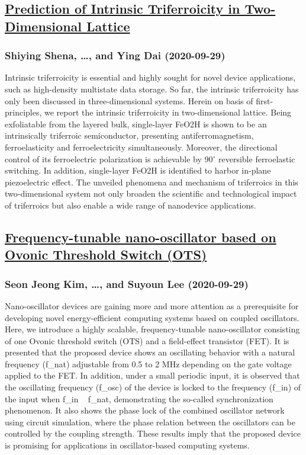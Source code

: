 \subsection*{\href{http://arxiv.org/abs/2009.13705v1}{Prediction of Intrinsic Triferroicity in Two-Dimensional Lattice}}
\subsubsection*{Shiying Shena, \dots, and Ying Dai (2020-09-29)}
Intrinsic triferroicity is essential and highly sought for novel device
applications, such as high-density multistate data storage. So far, the
intrinsic triferroicity has only been discussed in three-dimensional systems.
Herein on basis of first-principles, we report the intrinsic triferroicity in
two-dimensional lattice. Being exfoliatable from the layered bulk, single-layer
FeO2H is shown to be an intrinsically triferroic semiconductor, presenting
antiferromagnetism, ferroelasticity and ferroelectricity simultaneously.
Moreover, the directional control of its ferroelectric polarization is
achievable by 90$^{\circ}$ reversible ferroelastic switching. In addition,
single-layer FeO2H is identified to harbor in-plane piezoelectric effect. The
unveiled phenomena and mechanism of triferroics in this two-dimensional system
not only broaden the scientific and technological impact of triferroics but
also enable a wide range of nanodevice applications.

\subsection*{\href{http://arxiv.org/abs/2009.13703v1}{Frequency-tunable nano-oscillator based on Ovonic Threshold Switch (OTS)}}
\subsubsection*{Seon Jeong Kim, \dots, and Suyoun Lee (2020-09-29)}
Nano-oscillator devices are gaining more and more attention as a prerequisite
for developing novel energy-efficient computing systems based on coupled
oscillators. Here, we introduce a highly scalable, frequency-tunable
nano-oscillator consisting of one Ovonic threshold switch (OTS) and a
field-effect transistor (FET). It is presented that the proposed device shows
an oscillating behavior with a natural frequency (f\_{nat}) adjustable from 0.5
to 2 MHz depending on the gate voltage applied to the FET. In addition, under a
small periodic input, it is observed that the oscillating frequency (f\_{osc})
of the device is locked to the frequency (f\_{in}) of the input when f\_{in} ~
f\_{nat}, demonstrating the so-called synchronization phenomenon. It also shows
the phase lock of the combined oscillator network using circuit simulation,
where the phase relation between the oscillators can be controlled by the
coupling strength. These results imply that the proposed device is promising
for applications in oscillator-based computing systems.

